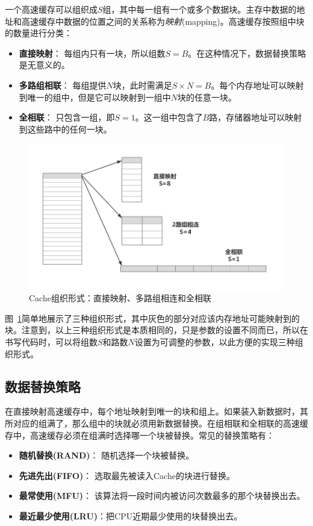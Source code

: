 \documentclass[12pt]{article} %
\begin{document}
\begin{sloppypar}
一个高速缓存可以组织成$S$组，其中每一组有一个或多个数据块。主存中数据的地址和高速缓存中数据的位置之间的关系称为{\em 映射}(mapping)。高速缓存按照组中块的数量进行分类：
\begin{itemize}
\item {\bf 直接映射}： 每组内只有一块，所以组数$S=B$。在这种情况下，数据替换策略是无意义的。
\item {\bf 多路组相联}： 每组提供$N$块，此时需满足$S\times N=B$。每个内存地址可以映射到唯一的组中，但是它可以映射到一组中$N$块的任意一块。
\item {\bf 全相联}： 只包含一组，即$S=1$。这一组中包含了$B$路，存储器地址可以映射到这些路中的任何一块。
\end{itemize}

\begin{figure}[h]
\centering
\includegraphics[width =\linewidth]{figure/Cachearch.jpg}
\caption{Cache组织形式：直接映射、多路组相连和全相联}
\label{fig:arch}
\end{figure}

图~\ref{fig:arch}简单地展示了三种组织形式，其中灰色的部分对应该内存地址可能映射到的块。注意到，以上三种组织形式是本质相同的，只是参数的设置不同而已，所以在书写代码时，可以将组数$S$和路数$N$设置为可调整的参数，以此方便的实现三种组织形式。

\subsection{数据替换策略}

在直接映射高速缓存中，每个地址映射到唯一的块和组上。如果装入新数据时，其所对应的组满了，那么组中的块就必须用新数据替换。在组相联和全相联的高速缓存中，高速缓存必须在组满时选择哪一个块被替换。常见的替换策略有：
\begin{itemize}
\item {\bf 随机替换(RAND)}： 随机选择一个块被替换。
\item {\bf 先进先出(FIFO)}： 选取最先被读入Cache的块进行替换。
\item {\bf 最常使用(MFU)}： 该算法将一段时间内被访问次数最多的那个块替换出去。
\item {\bf 最近最少使用(LRU)}：把CPU近期最少使用的块替换出去。
\end{itemize}


\end{sloppypar}
\end{document}
